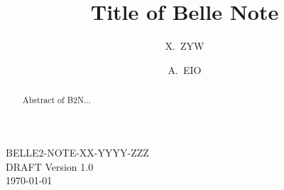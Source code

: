 \documentclass[preprint,prd,tightenlines]{revtex4}
\begin{document}
\def\belletwo {\it {Belle}}



\vspace*{-3\baselineskip}

\vspace*{-5\baselineskip}
\begin{flushright}
BELLE2-NOTE-XX-YYYY-ZZZ\\
DRAFT Version 1.0 \\
\today
\end{flushright}


\title { \quad\\[0.5cm] Title of Belle Note}


\author{X.~ZYW}

\author{A.~EIO}


\noaffiliation

\begin{abstract}
Abstract of B2N... 

\end{abstract}

\pacs{}

\maketitle
\end{document}
